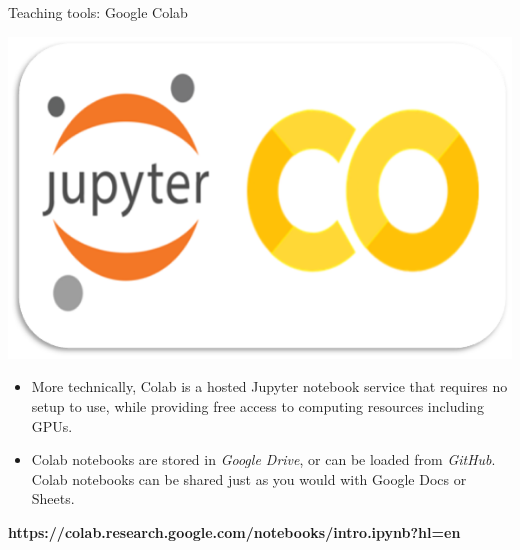 \documentclass[11pt]{beamer}
\begin{document}
\begin{frame}{Teaching tools: Google Colab}
	\noindent\begin{minipage}{0.5\textwidth}
		\includegraphics[width=\linewidth]{../05-pictures/lesson-1-1_pic_32.PNG}
	\end{minipage}%
	\hfill%
	\begin{minipage}{0.5\textwidth}
		\begin{itemize}
\item More technically, Colab is a hosted Jupyter notebook service that requires no setup to use, while providing free access to computing resources including GPUs.
\item Colab notebooks are stored in \textit{Google Drive}, or can be loaded from \textit{GitHub}. Colab notebooks can be shared just as you would with Google Docs or Sheets.
		\end{itemize}
	\end{minipage}
\vfill	
\footnotesize{\textbf{https://colab.research.google.com/notebooks/intro.ipynb?hl=en}}
\end{frame}
\end{document}
